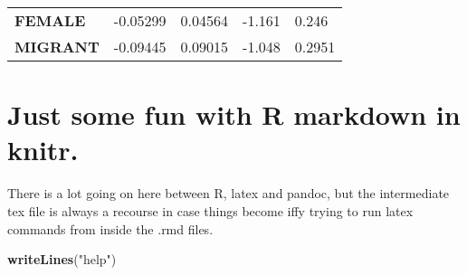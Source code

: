 \documentclass[]{article}
\newenvironment{Shaded}{\begin{snugshade}}{\end{snugshade}}
\newcommand{\KeywordTok}[1]{\textcolor[rgb]{0.13,0.29,0.53}{\textbf{#1}}}
\newcommand{\NormalTok}[1]{#1}
\newcommand{\StringTok}[1]{\textcolor[rgb]{0.31,0.60,0.02}{#1}}
\begin{document}
\begin{longtable}[]{@{}lllll@{}}
\begin{minipage}[t]{0.23\columnwidth}
\textbf{FEMALE}\strut
\end{minipage} & \begin{minipage}[t]{0.14\columnwidth}\raggedright
-0.05299\strut
\end{minipage} & \begin{minipage}[t]{0.16\columnwidth}\raggedright
0.04564\strut
\end{minipage} & \begin{minipage}[t]{0.12\columnwidth}\raggedright
-1.161\strut
\end{minipage} & \begin{minipage}[t]{0.16\columnwidth}\raggedright
0.246\strut
\end{minipage}\tabularnewline
\begin{minipage}[t]{0.23\columnwidth}\raggedright
\textbf{MIGRANT}\strut
\end{minipage} & \begin{minipage}[t]{0.14\columnwidth}\raggedright
-0.09445\strut
\end{minipage} & \begin{minipage}[t]{0.16\columnwidth}\raggedright
0.09015\strut
\end{minipage} & \begin{minipage}[t]{0.12\columnwidth}\raggedright
-1.048\strut
\end{minipage} & \begin{minipage}[t]{0.16\columnwidth}\raggedright
0.2951\strut
\end{minipage}\tabularnewline
\bottomrule
\end{longtable}

\hypertarget{just-some-fun-with-r-markdown-in-knitr.}{%
\section{Just some fun with R markdown in
knitr.}\label{just-some-fun-with-r-markdown-in-knitr.}}

There is a lot going on here between R, latex and pandoc, but the
intermediate tex file is always a recourse in case things become iffy
trying to run latex commands from inside the .rmd files.


\color{red}

\begin{Shaded}
\begin{Highlighting}[]
\KeywordTok{writeLines}\NormalTok{(}\StringTok{"help"}\NormalTok{)}
\end{Highlighting}
\end{Shaded}
\end{document}
